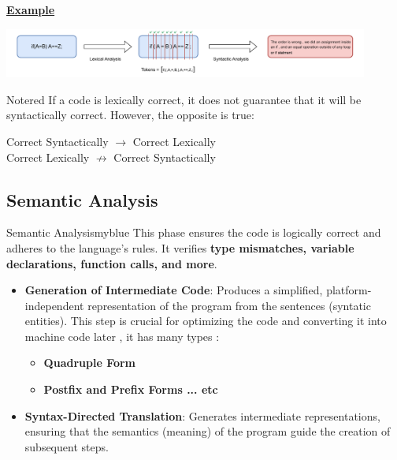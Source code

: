 \vspace{0.95cm}
\underline{\textbf{Example}}

\vspace{0.35cm}
\begin{center}
    \includegraphics[height=0.14\textheight,width=0.9\textwidth]{Chapters/Examples/Intro/ex3.drawio.pdf}
\end{center}

\vspace{0.5cm}

\begin{prettyBox}{Note}{red}
If a code is lexically correct, it does not guarantee that it will be syntactically correct. However, the opposite is true:

\begin{center}
    Correct Syntactically $\rightarrow$ Correct Lexically \\[0.15cm]
    Correct Lexically $\nrightarrow$ Correct Syntactically
\end{center}

\end{prettyBox}

\vspace{0.35cm}

\subsection{Semantic Analysis}
\begin{prettyBox}{Semantic Analysis}{myblue}
This phase ensures the code is logically correct and adheres to the language's rules. It verifies \textbf{type mismatches, variable declarations, function calls, and more}.

\begin{itemize}
    \item \textbf{Generation of Intermediate Code}: 
    Produces a simplified, platform-independent representation of the program from the sentences (syntatic entities). This step is crucial for optimizing the code and converting it into machine code later , it has many types :
    \begin{itemize}
        \item \textbf{Quadruple Form}
        \item \textbf{Postfix and Prefix Forms ... etc}
    \end{itemize}

    \item \textbf{Syntax-Directed Translation}: 
    Generates intermediate representations, ensuring that the semantics (meaning) of the program guide the creation of subsequent steps.
\end{itemize}
\end{prettyBox}

